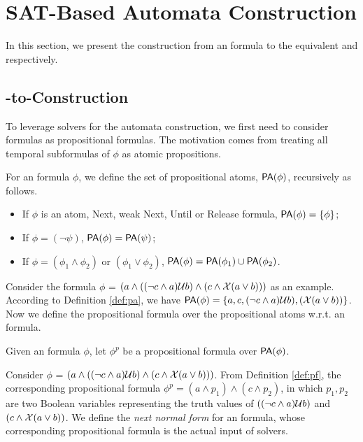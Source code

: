 \section{SAT-Based Automata Construction}\label{sec:main}

In this section, we present the construction from an \ltlf formula to the equivalent \NFA and \DFA respectively. 


\subsection{\ltlf-to-\NFA Construction}

To leverage \SAT solvers for the automata construction, we first need to consider \ltlf formulas as propositional formulas. The motivation comes from treating all temporal subformulas of $\phi$ as atomic propositions. 

\begin{definition}\label{def:pa}
For an \ltlf formula $\phi$, we define the set of propositional atoms, ${\sf PA}(\phi)$, recursively as follows.
\begin{itemize}
	\item If $\phi$ is an atom, Next, weak Next, Until or Release formula, ${\sf PA}(\phi)=\{\phi\}$;
	\item If $\phi = (\neg \psi)$, ${\sf PA}(\phi)= {\sf PA}(\psi)$;
	\item If $\phi = (\phi_1 \wedge \phi_2)$ or $(\phi_1 \vee \phi_2)$, ${\sf PA}(\phi) = {\sf PA}(\phi_1) \cup {\sf PA}(\phi_2)$.
\end{itemize}
\end{definition}

Consider the formula $\phi$ = $(a \wedge ((\neg c \wedge a)\mathcal{U} b) \wedge (c \wedge \mathcal{X} (a \vee b)))$ as an example. According to Definition \ref{def:pa}, we have ${\sf PA}(\phi)=\{a, c, (\neg c \wedge a)\mathcal{U} b), (\mathcal{X} (a \vee b))\}$. Now we define the propositional formula over the propositional atoms w.r.t. an \ltlf formula.

\begin{definition}\label{def:pf}
Given an \ltlf formula $\phi$, let $\phi^{p}$ be a propositional formula over ${\sf PA}(\phi)$. 
\end{definition}

Consider $\phi$ = $(a \wedge ((\neg c \wedge a)\mathcal{U} b) \wedge (c \wedge \mathcal{X} (a \vee b)))$. From Definition \ref{def:pf}, the corresponding propositional formula $\phi^p = (a \wedge p_1) \wedge (c \wedge p_2)$, in which $p_1, p_2$ are two Boolean variables representing the truth values of $((\neg c \wedge a)\mathcal{U} b)$ and $(c \wedge \mathcal{X} (a \vee b))$. We define the \emph{next normal form} for an \ltlf formula, whose corresponding propositional formula is the actual input of \SAT solvers.

